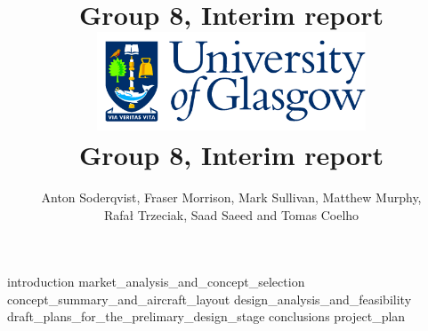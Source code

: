 \documentclass[12pt,titlepage,oneside]{book}
\author{Anton Soderqvist, Fraser Morrison, Mark Sullivan, Matthew Murphy, \\ Rafał Trzeciak, Saad Saeed and Tomas Coelho}
\title{Group 8, Interim report}
\begin{document}
\title{
\includegraphics[width=0.6\textwidth]{GlaLogo.pdf} \\
Group 8, Interim report
}
\maketitle
\setcounter{tocdepth}{1}
\tableofcontents

{introduction}
{market_analysis_and_concept_selection}
{concept_summary_and_aircraft_layout}
{design_analysis_and_feasibility}
{draft_plans_for_the_prelimary_design_stage}
{conclusions}
{project_plan}



\end{document}
